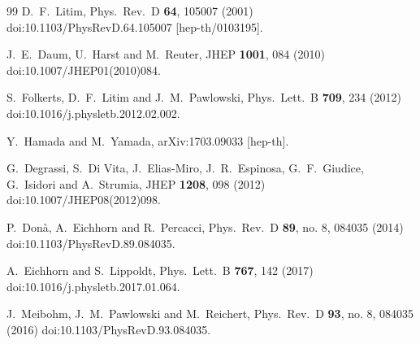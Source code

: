 \documentclass[%
 reprint,
 superscriptaddress,
preprintnumbers,
nofootinbib,
 amsmath,amssymb,
 aps,
prl,
]{revtex4-1}
\begin{document}
\begin{thebibliography}{99}
  D.~F.~Litim,
  Phys.\ Rev.\ D {\bf 64}, 105007 (2001)
  doi:10.1103/PhysRevD.64.105007
  [hep-th/0103195].
  
  J.~E.~Daum, U.~Harst and M.~Reuter,
  JHEP {\bf 1001}, 084 (2010)
  doi:10.1007/JHEP01(2010)084.
  
  S.~Folkerts, D.~F.~Litim and J.~M.~Pawlowski,
  Phys.\ Lett.\ B {\bf 709}, 234 (2012)
  doi:10.1016/j.physletb.2012.02.002.
  
  Y.~Hamada and M.~Yamada,
  arXiv:1703.09033 [hep-th].

  G.~Degrassi, S.~Di Vita, J.~Elias-Miro, J.~R.~Espinosa, G.~F.~Giudice, G.~Isidori and A.~Strumia,
  JHEP {\bf 1208}, 098 (2012)
  doi:10.1007/JHEP08(2012)098.
  
  P.~Don\`a, A.~Eichhorn and R.~Percacci,
  Phys.\ Rev.\ D {\bf 89}, no. 8, 084035 (2014)
  doi:10.1103/PhysRevD.89.084035.

  A.~Eichhorn and S.~Lippoldt,
  Phys.\ Lett.\ B {\bf 767}, 142 (2017)
  doi:10.1016/j.physletb.2017.01.064.

  
  J.~Meibohm, J.~M.~Pawlowski and M.~Reichert,
  Phys.\ Rev.\ D {\bf 93}, no. 8, 084035 (2016)
  doi:10.1103/PhysRevD.93.084035.
  

\end{thebibliography}
\end{document}
